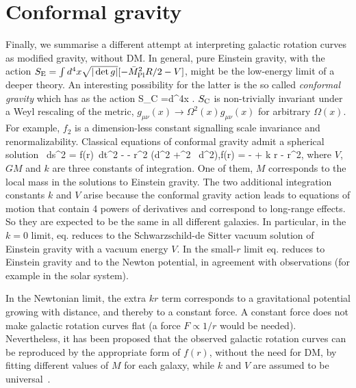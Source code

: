 \section{Conformal gravity}\label{ConformalGravity}
Finally, we summarise a different attempt at interpreting galactic rotation curves as modified gravity, without DM.
In general, pure Einstein gravity, with the action $S_{\rm E} = \int d^4x \sqrt{|\det g|}[-\bar{M}_{\rm Pl}^2 R/2 - V]$, 
might be the low-energy limit of a deeper theory.
An interesting possibility for the latter is the so called {\em conformal gravity} which has as the action
\beq 
S_{\rm C} =\int d^4x  .
\eeq
$S_{\rm C}$ is non-trivially invariant under a Weyl rescaling of the metric, $g_{\mu\nu}(x)\to \Omega^2(x) g_{\mu\nu}(x)$ for arbitrary $\Omega(x)$.
For example, $f_2$ is a dimension-less constant signalling scale invariance and renormalizability.
Classical equations of conformal gravity admit a spherical  solution~\cite{ConformalGravity}
\beq \label{eq:krmetric}
ds^2 = f(r)\, dt^2 -  - r^2 (d\theta^2 +\sin^2 \theta\, d\varphi^2),\qquad f(r) =  -  + k r  -  r^2,
\eeq
where $V$, $GM$ and $k$ are three constants of integration.
One of them, $M$ corresponds to the local mass in the solutions to Einstein gravity.
The two additional integration constants $k$ and $V$
arise because the conformal gravity action leads to equations of motion that contain 4 powers of derivatives
and correspond to long-range effects.
So they are expected to be the same in all different galaxies.
In particular, in the $k=0$ limit, eq. reduces to the Schwarzschild-de Sitter vacuum solution of Einstein gravity with a vacuum energy $V$.
In the small-$r$ limit eq. reduces to Einstein gravity and to the Newton potential,
in agreement with observations (for example in the solar system).

In the Newtonian limit, the extra $kr$ term corresponds to a gravitational potential growing with distance, and thereby to a constant force.
A constant force does not make galactic rotation curves flat (a force $F \propto 1/r$ would be needed).
Nevertheless, it has been proposed that the observed galactic rotation curves can be reproduced by the appropriate form of $f(r)$, 
without the need for DM,
by fitting different values of $M$ for each galaxy,
while $k$ and $V$ are assumed to be universal~\cite{ConformalGravity}.

